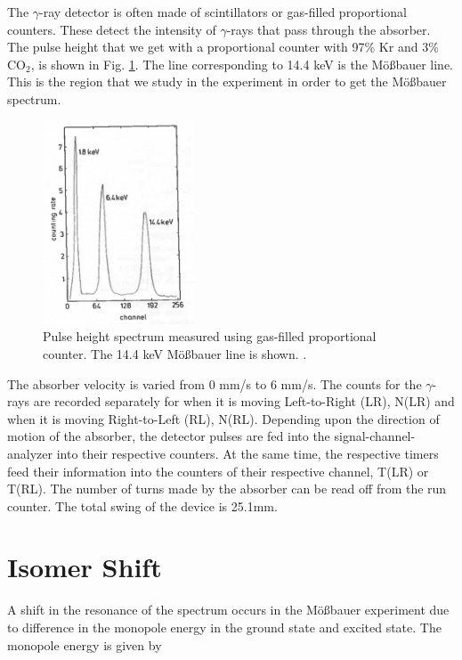 \documentclass[a4paper]{report}
\numberwithin{equation}{section}
\begin{document}
The $\gamma$-ray detector is often made of scintillators or gas-filled proportional counters. These detect the intensity of $\gamma$-rays that pass through the absorber. The pulse height that we get with a proportional counter with 97\% Kr and 3\% CO$_2$, is shown in Fig. \ref{fig:pulse-height}. The line corresponding to 14.4 keV is the M\"o{\ss}bauer line. This is the region that we study in the experiment in order to get the M\"o{\ss}bauer spectrum. 

\begin{figure}[htpb]
    \centering
    \includegraphics[width=0.4\textwidth]{pulse-height}
    \caption{Pulse height spectrum measured using gas-filled proportional counter. The 14.4 keV M\"o{\ss}bauer line is shown. \cite{Schatz1996}.}
    \label{fig:pulse-height}
\end{figure}

The absorber velocity is varied from 0 mm/s to 6 mm/s. The counts for the $\gamma$-rays are recorded separately for when it is moving Left-to-Right (LR), N(LR) and when it is moving Right-to-Left (RL), N(RL). Depending upon the direction of motion of the absorber, the detector pulses are fed into the signal-channel-analyzer into their respective counters. At the same time, the respective timers feed their information into the counters of their respective channel, T(LR) or T(RL). The number of turns made by the absorber can be read off from the run counter. The total swing of the device is 25.1mm. 

\section{Isomer Shift}

A shift in the resonance of the spectrum occurs in the M\"o{\ss}bauer experiment due to difference in the monopole energy in the ground state and excited state. The monopole energy is given by
\end{document}
